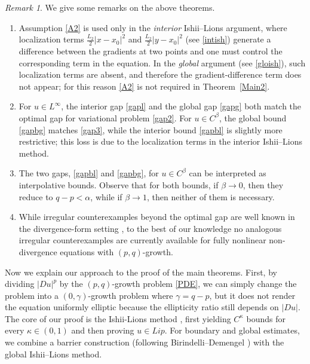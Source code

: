 \documentclass[reqno]{amsart}
\theoremstyle{plain}
\theoremstyle{definition}
\theoremstyle{remark}
\newtheorem{rmk}{Remark}[section]
\numberwithin{equation}{section}
\begin{document}
\begin{rmk}
We give some remarks on the above theorems.
\begin{enumerate}
\item Assumption \ref{A2} is used only in the \emph{interior} Ishii--Lions argument, where localization terms  $\tfrac{L_2}{2}|x-x_0|^2 $ and $\tfrac{L_2}{2}|y-x_0|^2 $ (see \eqref{intish}) generate a difference between the gradients at two points and one must control the corresponding term in the equation. In the \emph{global} argument (see \eqref{gloish}), such localization terms are absent, and therefore the gradient-difference term does not appear; for this reason \ref{A2} is not required in Theorem~\ref{Main2}.
\item For $u\in L^\infty$, the interior gap \eqref{gapl} and the global gap \eqref{gapg} both match the optimal gap for variational problem \eqref{gap2}.
For $u\in C^\beta$, the global bound \eqref{gapbg} matches \eqref{gap3}, while the interior bound \eqref{gapbl} is slightly more restrictive; this loss is due to the localization terms in the interior Ishii--Lions method.
 \item The two gaps, \eqref{gapbl} and \eqref{gapbg}, for $u \in C^\beta$ can be interpreted as interpolative bounds. 
 Observe that for both bounds, if $\beta \rightarrow 0$, then they reduce to $q-p<\alpha$, while if $\beta \rightarrow 1$, then neither of them is necessary.  
 \item While irregular counterexamples beyond the optimal gap are well known in the divergence-form setting \cite{Mingione04, Balci20}, to the best of our knowledge no analogous irregular counterexamples are currently available for fully nonlinear non-divergence equations with $(p,q)$-growth.
\end{enumerate}
\end{rmk}



Now we explain our approach to the proof of the main theorems.
First, by dividing $|Du|^{p}$ by the $(p,q)$-growth problem \eqref{PDE}, we can simply change the problem into a $(0,\gamma)$-growth problem where $\gamma=q-p$, but it does not render the equation uniformly elliptic because the ellipticity ratio still depends on $|Du|$.
The core of our proof is the Ishii-Lions method \cite{Ishii92,Ishii90}, first yielding $C^\kappa$ bounds for every $\kappa\in(0,1)$ and then proving $u \in Lip$.
For boundary and global estimates, we combine a barrier construction (following Birindelli--Demengel \cite{Birindelli14}) with the global Ishii--Lions method.
\end{document}
